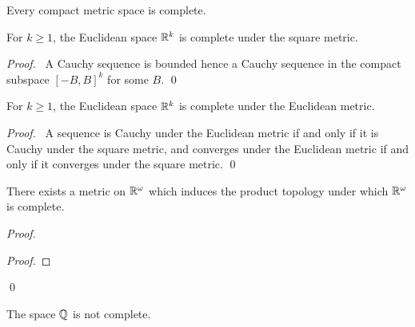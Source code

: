 \begin{corollary}
    \label{corollary:compact_complete}
    Every compact metric space is complete.
\end{corollary}

\begin{proposition}
    For $k \geq 1$, the Euclidean space $\mathbb{R}^k$ is complete under the square metric.
\end{proposition}

\begin{proof}
    \pf\ A Cauchy sequence is bounded hence a Cauchy sequence in the compact subspace $[-B,B]^k$
    for some $B$. \qed
\end{proof}

\begin{proposition}
    For $k \geq 1$, the Euclidean space $\mathbb{R}^k$ is complete under the Euclidean metric.
\end{proposition}

\begin{proof}
    \pf\ A sequence is Cauchy under the Euclidean metric if and only if it is Cauchy under the
    square metric, and converges under the Euclidean metric if and only if it converges under
    the square metric. \qed
\end{proof}

\begin{proposition}
    There exists a metric on $\mathbb{R}^\omega$ which induces the product topology under which $\mathbb{R}^\omega$
    is complete.
\end{proposition}

\begin{proof}
    \pf
    \begin{proof}
    \end{proof}
    \qed
\end{proof}

\begin{proposition}
    The space $\mathbb{Q}$ is not complete.
\end{proposition}

